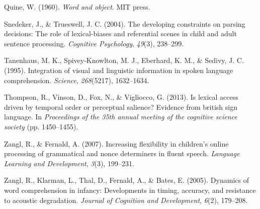\documentclass[12pt,]{article}
\begin{document}
Quine, W. (1960). \emph{Word and object}. MIT press.

Snedeker, J., \& Trueswell, J. C. (2004). The developing constraints on
parsing decisions: The role of lexical-biases and referential scenes in
child and adult sentence processing. \emph{Cognitive Psychology},
\emph{49}(3), 238--299.

Tanenhaus, M. K., Spivey-Knowlton, M. J., Eberhard, K. M., \& Sedivy, J.
C. (1995). Integration of visual and linguistic information in spoken
language comprehension. \emph{Science}, \emph{268}(5217), 1632--1634.

Thompson, R., Vinson, D., Fox, N., \& Vigliocco, G. (2013). Is lexical
access driven by temporal order or perceptual salience? Evidence from
british sign language. In \emph{Proceedings of the 35th annual meeting
of the cognitive science society} (pp. 1450--1455).

Zangl, R., \& Fernald, A. (2007). Increasing flexibility in children's
online processing of grammatical and nonce determiners in fluent speech.
\emph{Language Learning and Development}, \emph{3}(3), 199--231.

Zangl, R., Klarman, L., Thal, D., Fernald, A., \& Bates, E. (2005).
Dynamics of word comprehension in infancy: Developments in timing,
accuracy, and resistance to acoustic degradation. \emph{Journal of
Cognition and Development}, \emph{6}(2), 179--208.
\end{document}
